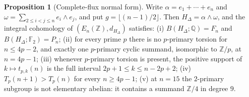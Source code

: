 \documentclass[11pt]{article}
\theoremstyle{definition}
\newcommand{\Z}{\mathbb Z}
\providecommand{\Z}{\mathbb Z}
\newtheorem{proposition}{Proposition}
\begin{document}
\begin{proposition}[Complete-flux normal form]\label{aa:flux}
Write $\alpha=e_1+\cdots+e_n$ and $\omega=\sum_{2\le i<j\le n}e_i\wedge e_j$, and put $g=\lfloor(n-1)/2\rfloor$.  Then $H_\Delta=\alpha\wedge\omega$, and the integral cohomology of $(E_n(\Z),d_{H_\Delta})$ satisfies:
(i) $B(H_\Delta;\mathbb Q)=F_n$ and $B(H_\Delta;\mathbb F_2)=P_n$;
(ii) for every prime $p$ there is no $p$-primary torsion for $n\le4p-2$, and exactly one $p$-primary cyclic summand, isomorphic to $\Z/p$, at $n=4p-1$;
(iii) whenever $p$-primary torsion is present, the positive support of $k\mapsto t_{p,k}(n)$ is the full interval $2p+1\le k\le n-2p+2$;
(iv) $T_p(n+1)>T_p(n)$ for every $n\ge4p-1$;
(v) at $n=15$ the $2$-primary subgroup is not elementary abelian: it contains a summand $\Z/4$ in degree $9$.
\end{proposition}
\end{document}
